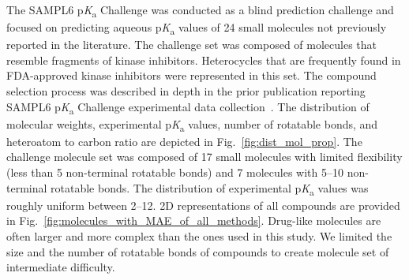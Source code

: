 \documentclass[9pt,lineno,final]{elife}
\newcommand{\pKa}{p\textit{K}\textsubscript{a}}
\begin{document}
The SAMPL6 \pKa{} Challenge was conducted as a blind prediction challenge and focused on predicting aqueous \pKa{} values of 24 small molecules not previously reported in the literature. 
The challenge set was composed of molecules that resemble fragments of kinase inhibitors. 
Heterocycles that are frequently found in FDA-approved kinase inhibitors were represented in this set. 
The compound selection process was described in depth in the prior publication reporting SAMPL6 \pKa{} Challenge experimental data collection~\citep{Isik:2018:J.Comput.AidedMol.Des.}.
The distribution of molecular weights, experimental \pKa{} values, number of rotatable bonds, and heteroatom to carbon ratio are depicted in Fig.~\ref{fig:dist_mol_prop}. 
The challenge molecule set was composed of 17 small molecules with limited flexibility (less than 5 non-terminal rotatable bonds) and 7 molecules with 5--10 non-terminal rotatable bonds. 
The distribution of experimental \pKa{} values was roughly uniform between 2--12.
2D representations of all compounds are provided in Fig.~\ref{fig:molecules_with_MAE_of_all_methods}. 
Drug-like molecules are often larger and more complex than the ones used in this study. 
We limited the size and the number of rotatable bonds of compounds to create molecule set of intermediate difficulty.
\end{document}
